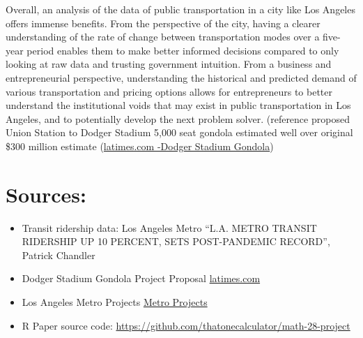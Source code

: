 \documentclass[
]{article}
\providecommand{\tightlist}{%
  \setlength{\itemsep}{0pt}\setlength{\parskip}{0pt}}
\begin{document}
\hfill\break
Overall, an analysis of the data of public transportation in a city like
Los Angeles offers immense benefits. From the perspective of the city,
having a clearer understanding of the rate of change between
transportation modes over a five-year period enables them to make better
informed decisions compared to only looking at raw data and trusting
government intuition. From a business and entrepreneurial perspective,
understanding the historical and predicted demand of various
transportation and pricing options allows for entrepreneurs to better
understand the institutional voids that may exist in public
transportation in Los Angeles, and to potentially develop the next
problem solver. (reference proposed Union Station to Dodger Stadium
5,000 seat gondola estimated well over original \$300 million estimate
(\href{https://www.latimes.com/sports/story/2023-04-30/dodger-stadium-gondola-project-frank-mccourt}{latimes.com
-Dodger Stadium Gondola})

\newpage

\hypertarget{sources}{%
\section{Sources:}\label{sources}}

\begin{itemize}
\tightlist
\item
  Transit ridership data: Los Angeles Metro ``L.A. METRO TRANSIT
  RIDERSHIP UP 10 PERCENT, SETS POST-PANDEMIC RECORD'', Patrick Chandler
\item
  Dodger Stadium Gondola Project Proposal
  \href{https://www.latimes.com/sports/story/2023-04-30/dodger-stadium-gondola-project-frank-mccourt}{latimes.com}
\item
  Los Angeles Metro Projects
  \href{https://www.metro.net/projects/}{Metro Projects}
\item
  R Paper source code:
  \url{https://github.com/thatonecalculator/math-28-project}
\end{itemize}
\end{document}
